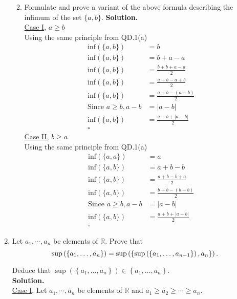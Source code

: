 \documentclass[11pt]{article}
\begin{document}
\begin{enumerate}
\begin{enumerate}
		            \newpage
		      \item Formulate and prove a variant of the above formula describing the infimum of the set $\{a, b\}$.
		            \textbf{Solution.}\\
		            \underline{Case I}, $a \geq b$ \\
		            Using the same principle from QD.1(a)
		            \begin{align*}
			            \text{inf}(\{a, b\})          & = b                   \\
			            \text{inf}(\{a, b\})          & = b + a - a           \\
			            \text{inf}(\{a, b\})          & = \frac{b + b+a-a}{2} \\
			            \text{inf}(\{a, b\})          & = \frac{a+b-a+b}{2}   \\
			            \text{inf}(\{a, b\})          & = \frac{a+b-(a-b)}{2} \\
			            \text{Since } a \geq b, a - b & = |a-b|               \\
			            \text{inf}(\{a, b\})          & = \frac{a+b+|a-b|}{2}
			            \\ \square
		            \end{align*}
		            \underline{Case II}, $b \geq a$ \\
		            Using the same principle from QD.1(a)
		            \begin{align*}
			            \text{inf}(\{a, a\})          & = a                   \\
			            \text{inf}(\{a, b\})          & = a + b - b           \\
			            \text{inf}(\{a, b\})          & = \frac{a+b-b+a}{2}   \\
			            \text{inf}(\{a, b\})          & = \frac{b+b-(b-b)}{2} \\
			            \text{Since } a \geq b, a - b & = |a-b|               \\
			            \text{inf}(\{a, b\})          & = \frac{a+b+|a-b|}{2}
			            \\ \square
		            \end{align*}
	      \end{enumerate}
	\item Let $a_1, \cdots, a_n$ be elements of $\mathbb{R}$. Prove that $$
		      \sup \left(\left\{a_1, \ldots, a_n\right\}\right)=\sup \left(\left\{\sup \left(\left\{a_1, \ldots, a_{n-1}\right\}\right), a_n\right\}\right) .
		      \\
	      $$


	      Deduce that $\sup \left(\left\{a_1, \ldots, a_n\right\}\right) \in\left\{a_1, \ldots, a_n\right\}$.
	      \\
	      \textbf{Solution.}\\
	      \underline{Case I}, Let $a_1, \cdots, a_n$ be elements of $\mathbb{R}$ and $a_1 \geq a_2 \geq \cdots \geq a_n$.

\end{enumerate}
\end{document}
